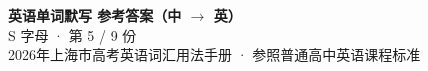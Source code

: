 \documentclass[10pt,a4paper]{article}
\begin{document}
\pagestyle{plain}

\begin{center}
{\LARGE\bfseries 英语单词默写 \quad 参考答案（中 $\to$ 英）}\\[0.22em]
{\large S 字母 · 第 5 / 9 份}\\[0.18em]
{\small 2026年上海市高考英语词汇用法手册 · 参照普通高中英语课程标准}
\end{center}

\vspace{0.2em}
\noindent{\color{rulegray}\rule{\textwidth}{0.8pt}}

\vspace{0.35em}

\vspace{0.25em}
\renewcommand{\arraystretch}{1.32}
\end{document}
